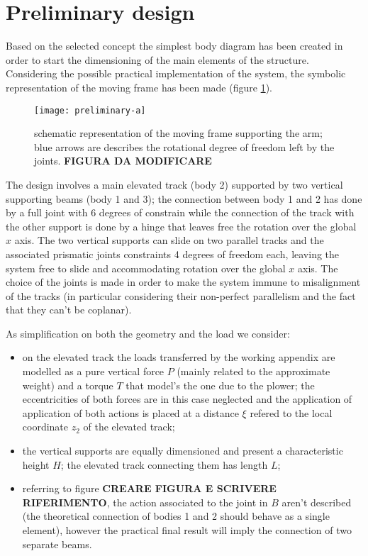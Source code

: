 \section{Preliminary design}
	Based on the selected concept the simplest body diagram has been created in order to start the dimensioning of the main elements of the structure. Considering the possible practical implementation of the system, the symbolic representation of the moving frame has been made (figure \ref{fig:freebodydiagramframe}).
	
	\begin{figure}[bht]
		\centering \texttt{[image: preliminary-a]}
		\caption{schematic representation of the moving frame supporting the arm; blue arrows are describes the rotational degree of freedom left by the joints. \textbf{FIGURA DA MODIFICARE}}
		\label{fig:freebodydiagramframe}
	\end{figure}
	
	The design involves a main elevated track (body 2) supported by two vertical supporting beams (body 1 and 3); the connection between body 1 and 2 has done by a full joint with 6 degrees of constrain while the connection of the track with the other support is done by a hinge that leaves free the rotation over the global $x$ axis. The two vertical supports can slide on two parallel tracks and the associated prismatic joints constraints 4 degrees of freedom each, leaving the system free to slide and accommodating rotation over the global $x$ axis. The choice of the joints is made in order to make the system immune to misalignment of the tracks (in particular considering their non-perfect parallelism and the fact that they can't be coplanar).
	
	As simplification on both the geometry and the load we consider:
	\begin{itemize}
		\item on the elevated track the loads transferred by the working appendix are modelled as a pure vertical force $P$ (mainly related to the approximate weight) and a torque $T$ that model's the one due to the plower; the eccentricities of both forces are in this case neglected and the application of application of both actions is placed at a distance $\xi$ refered to the local coordinate $z_2$ of the elevated track;
		
		\item the vertical supports are equally dimensioned and present a characteristic height $H$; the elevated track connecting them has length $L$;
		
		\item referring to figure \textbf{CREARE FIGURA E SCRIVERE RIFERIMENTO}, the action associated to the joint in $B$ aren't described (the theoretical connection of bodies 1 and 2 should behave as a single element), however the practical final result will imply the connection of two separate beams.	
		
	\end{itemize}

